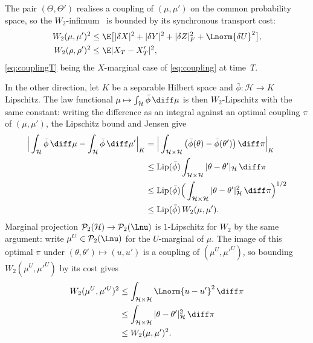 \begin{remark}\label{rem:wasserstein-bounds}
The pair $(\Theta,\Theta')$ realises a coupling of $(\mu,\mu')$ on the common probability
space, so the $W_2$-infimum~\cite[Definition~6.1]{Villani2009} is bounded by its synchronous transport
cost:
\begin{align}
W_2(\mu,\mu')^2&\le\E\big[|\delta X|^2+|\delta Y|^2+|\delta Z|_F^2+\Lnorm{\delta U}^2\big],
\label{eq:coupling}\\
W_2(\rho,\rho')^2&\le\E|X_T-X'_T|^2 ,\label{eq:couplingT}
\end{align}
\eqref{eq:couplingT} being the $X$-marginal case of \eqref{eq:coupling} at time~$T$.

In the other direction, let $K$ be a separable Hilbert space and $\bar\phi:\mathcal H\to K$
Lipschitz. The law functional $\mu\mapsto\int_{\mathcal H}\bar\phi\,\diff\mu$ is then
$W_2$-Lipschitz with the same constant: writing the difference as an integral against an
optimal coupling $\pi$ of $(\mu,\mu')$, the Lipschitz bound and Jensen give
\begin{align}
\Big|\int_{\mathcal H}\bar\phi\,\diff\mu-\int_{\mathcal H}\bar\phi\,\diff\mu'\Big|_K
&=\Big|\int_{\mathcal H\times\mathcal H}\big(\bar\phi(\theta)-\bar\phi(\theta')\big)\,\diff\pi\Big|_K\nonumber\\
&\le\mathrm{Lip}(\bar\phi)\int_{\mathcal H\times\mathcal H}|\theta-\theta'|_{\mathcal H}\,\diff\pi\nonumber\\
&\le\mathrm{Lip}(\bar\phi)\Big(\int_{\mathcal H\times\mathcal H}|\theta-\theta'|_{\mathcal H}^2\,\diff\pi\Big)^{1/2}\nonumber\\
&\le\mathrm{Lip}(\bar\phi)\,W_2(\mu,\mu') .\label{eq:lipfun}
\end{align}
Marginal projection $\mathcal P_2(\mathcal H)\to\mathcal P_2(\Lnu)$ is $1$-Lipschitz for $W_2$
by the same argument: write $\mu^U\in\mathcal P_2(\Lnu)$ for the $U$-marginal of $\mu$. The image
of this optimal $\pi$ under $(\theta,\theta')\mapsto(u,u')$ is a coupling of
$(\mu^U,\mu'^U)$, so bounding $W_2(\mu^U,\mu'^U)$ by its cost gives
\begin{align}
W_2(\mu^U,\mu'^U)^2
&\le\int_{\mathcal H\times\mathcal H}\Lnorm{u-u'}^2\,\diff\pi\nonumber\\
&\le\int_{\mathcal H\times\mathcal H}|\theta-\theta'|_{\mathcal H}^2\,\diff\pi\nonumber\\
&\le W_2(\mu,\mu')^2 .\label{eq:margproj}
\end{align}
\end{remark}
